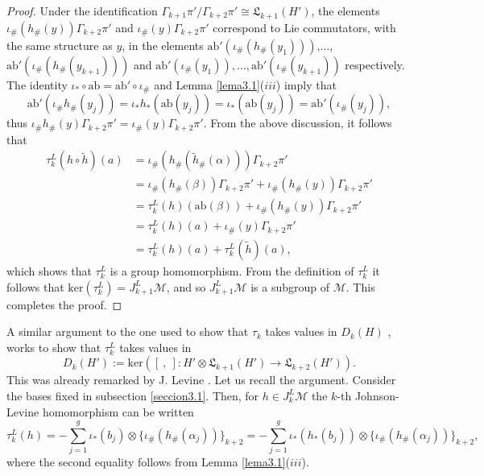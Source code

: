 \documentclass[10pt]{amsart}
\numberwithin{equation}{section}
\numberwithin{equation}{section}
\theoremstyle{definition}
\begin{document}
\begin{proof}
Under the identification $\Gamma_{k+1}\pi'/\Gamma_{k+2}\pi'\cong \mathfrak{L}_{k+1}(H')$, the elements $\iota_{\#}(h_{\#}(y))\Gamma_{k+2}\pi'$ and $\iota_{\#}(y)\Gamma_{k+2}\pi'$ correspond to Lie commutators,  with the same structure as $y$, in the elements $\text{ab}'(\iota_{\#}(h_{\#}(y_1)))$,$\ldots$, $\text{ab}'(\iota_{\#}(h_{\#}(y_{k+1})))$ and $\text{ab}'(\iota_{\#}(y_1)),\ldots, \text{ab}'(\iota_{\#}(y_{k+1}))$ respectively. The identity $\iota_*\circ \text{ab}=\text{ab}'\circ \iota_{\#}$ and  Lemma \ref{lema3.1}($iii$)  imply that
$$\text{ab}'(\iota_{\#}h_{\#}(y_j))=\iota_{*}h_{*}(\text{ab}(y_j))=\iota_{*}(\text{ab}(y_j))=\text{ab}'(\iota_{\#}(y_j)),$$
\noindent thus $\iota_{\#}h_{\#}(y)\Gamma_{k+2}\pi'=\iota_{\#}(y)\Gamma_{k+2}\pi'$.  From the above discussion, it follows that 
\begin{equation}\label{ecuacion3.11}%
\begin{split}
\tau_k^L(h\circ\widetilde{h})(a) & = \iota_{\#}(h_{\#}(\widetilde{h}_{\#}(\alpha)))\Gamma_{k+2}\pi'\\
																 & = \iota_{\#}(h_{\#}(\beta))\Gamma_{k+2}\pi'+\iota_{\#}(h_{\#}(y))\Gamma_{k+2}\pi'\\
																 & = \tau_k^L(h)(\text{ab}(\beta))+\iota_{\#}(h_{\#}(y))\Gamma_{k+2}\pi'\\
																 & = \tau_k^L(h)(a)+\iota_{\#}(y)\Gamma_{k+2}\pi'\\
																 & = \tau_k^L(h)(a)+\tau_k^L(\widetilde{h})(a),
\end{split}
\end{equation}
which shows that $\tau_k^L$ is a group homomorphism. From the definition of $\tau_k^L$ it follows that $\text{ker}(\tau_k^L)=J_{k+1}^L\mathcal{M}$, and so $J_{k+1}^L\mathcal{M}$ is a subgroup of $\mathcal{M}$. This completes the proof.
\end{proof}


 A similar argument to the one used to show that $\tau_k$ takes values in $D_k(H)$ \cite[Remark 3.3]{MR1224104}, works to show that $\tau_k^L$ takes values in
\begin{equation}\label{ecuacion3.12}%
D_k(H'):=\text{ker}\left(\left[\ ,\ \right]:H'\otimes\mathfrak{L}_{k+1}(H')\longrightarrow\mathfrak{L}_{k+2}(H')\right).
\end{equation}
This was already remarked by J. Levine \cite[Proposition 4.3]{MR1823501}. Let us recall the argument.  Consider the bases fixed in subsection \ref{seccion3.1}. Then, for  $h\in J_k^L\mathcal{M}$  the $k$-th Johnson-Levine homomorphism can be written
\begin{equation}\label{ecuacion3.13}%
\tau_k^L(h)=-\sum_{j=1}^{g}\iota_{*}(b_j)\otimes\{\iota_{\#}(h_{\#}(\alpha_j))\}_{k+2}=-\sum_{j=1}^{g}\iota_{*}(h_{*}(b_j))\otimes\{\iota_{\#}(h_{\#}(\alpha_j))\}_{k+2},
\end{equation}
where the second equality follows from Lemma \ref{lema3.1}($iii$).
\end{document}
